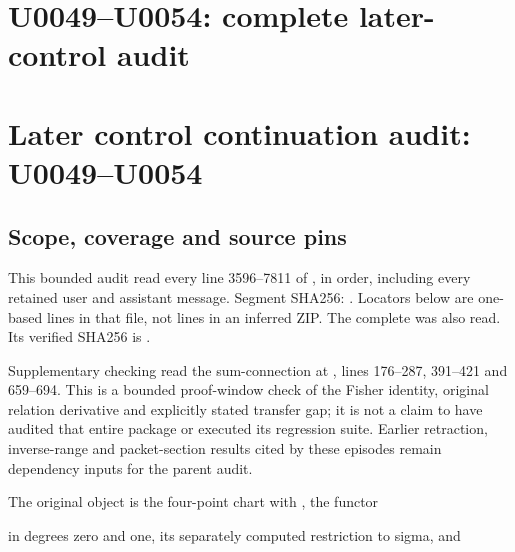 \section{U0049--U0054: complete later-control
audit}\label{TranscriptLedgerStage:u0049u0054-complete-later-control-audit}

\section{Later control continuation audit:
U0049--U0054}\label{TranscriptLedgerStage:later-control-continuation-audit-u0049u0054}

\subsection{Scope, coverage and source
pins}\label{TranscriptLedgerStage:scope-coverage-and-source-pins}

This bounded audit read every line 3596--7811 of
\protect{},
in order, including every retained user and assistant message. Segment
SHA256:
\protect{}.
Locators below are one-based lines in that file, not lines in an
inferred ZIP. The complete
\protect{}
was also read. Its verified SHA256 is
\protect{}.

Supplementary checking read the sum-connection \protect{}
at
\protect{},
lines 176--287, 391--421 and 659--694. This is a bounded proof-window
check of the Fisher identity, original relation derivative and
explicitly stated transfer gap; it is not a claim to have audited that
entire package or executed its regression suite. Earlier retraction,
inverse-range and packet-section results cited by these episodes remain
dependency inputs for the parent audit.

The original object is the four-point chart with
\protect{}, the functor


in degrees zero and one, its separately computed restriction to sigma,
and

